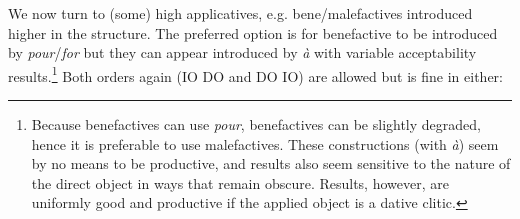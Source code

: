 \documentclass[output=paper]{langsci/langscibook}
\begin{document}
We now turn to (some) high applicatives, e.g.
bene\slash male\-factives introduced high\-er in the structure. The preferred option is
for benefactive to be introduced by \emph{pour}/\emph{for} but they can appear
introduced by \emph{à} with variable acceptability results.\footnote{Because
    benefactives can use {\it pour}, benefactives can be slightly degraded,
    hence it is preferable to use malefactives. These constructions (with
    \emph{à}) seem by no means to be productive, and results also seem
    sensitive to the nature of the direct object in ways that remain obscure.
    Results, however, are uniformly good and productive if the applied object
is a dative clitic.} Both orders again (IO DO and DO IO) are
allowed but  is fine in either:
\end{document}
